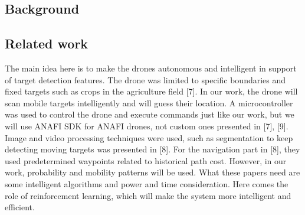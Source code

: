 \documentclass[../main.tex]{subfiles}
\begin{document}
\subsection{Background}



\subsection{Related work}




The main idea here is to make the drones autonomous and intelligent in support of target detection features. The drone was limited to specific boundaries and fixed targets such as crops in the agriculture field [7].
In our work, the drone will scan mobile targets intelligently and will guess their location.
 A microcontroller was used to control the drone and execute commands just like our work, but we will use ANAFI SDK for ANAFI drones, not custom ones presented in [7], [9]. 
Image and video processing techniques were used, such as segmentation to keep detecting moving targets was presented in [8].
For the navigation part in [8], they used predetermined waypoints related to historical path cost. However, in our work, probability and mobility patterns will be used. What these papers need are some intelligent algorithms and power and time consideration. Here comes the role of reinforcement learning, which will make the system more intelligent and efficient.
\end{document}
